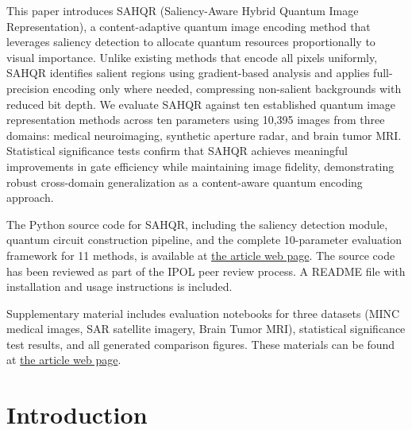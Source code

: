 \documentclass{ipol}
\begin{document}
\begin{ipolAbstract}
This paper introduces SAHQR (Saliency-Aware Hybrid Quantum Image Representation), a content-adaptive quantum image encoding method that leverages saliency detection to allocate quantum resources proportionally to visual importance. Unlike existing methods that encode all pixels uniformly, SAHQR identifies salient regions using gradient-based analysis and applies full-precision encoding only where needed, compressing non-salient backgrounds with reduced bit depth. We evaluate SAHQR against ten established quantum image representation methods across ten parameters using 10,395 images from three domains: medical neuroimaging, synthetic aperture radar, and brain tumor MRI. Statistical significance tests confirm that SAHQR achieves meaningful improvements in gate efficiency while maintaining image fidelity, demonstrating robust cross-domain generalization as a content-aware quantum encoding approach.
\end{ipolAbstract}

\begin{ipolCode}
The Python source code for SAHQR, including the saliency detection module, quantum circuit construction pipeline, and the complete 10-parameter evaluation framework for 11 methods, is available at \href{\ipolLink}{the article web page}. The source code has been reviewed as part of the IPOL peer review process. A README file with installation and usage instructions is included.
\end{ipolCode}

\begin{ipolSupp}
Supplementary material includes evaluation notebooks for three datasets (MINC medical images, SAR satellite imagery, Brain Tumor MRI), statistical significance test results, and all generated comparison figures. These materials can be found at \href{\ipolLink}{the article web page}.
\end{ipolSupp}


\section{Introduction}\label{sec:introduction}
\end{document}
